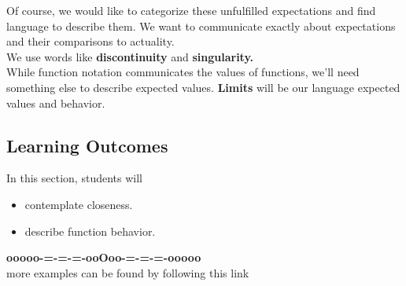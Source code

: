 \documentclass{ximera}
\begin{document}
Of course, we would like to categorize these unfulfilled expectations and find language to describe them. We want to communicate exactly about expectations and their comparisons to actuality. \\


We use words like \textbf{\textcolor{purple!85!blue}{discontinuity}} and \textbf{\textcolor{purple!85!blue}{singularity.}} \\


While function notation communicates the values of functions, we'll need something else to describe expected values. \textbf{\textcolor{purple!85!blue}{Limits}} will be our language expected values and behavior.





\subsection*{Learning Outcomes}


\begin{sectionOutcomes}
In this section, students will 

\begin{itemize}
\item contemplate closeness.
\item describe function behavior.
\end{itemize}
\end{sectionOutcomes}















\begin{center}
\textbf{\textcolor{green!50!black}{ooooo-=-=-=-ooOoo-=-=-=-ooooo}} \\

more examples can be found by following this link\\ 

\end{center}
\end{document}

